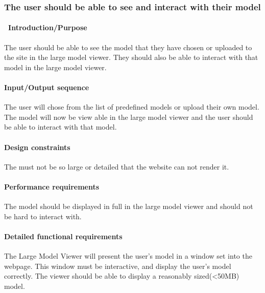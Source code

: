 \documentclass[letterpaper, 10pt, draftclsnofoot, compsoc, onecolumn]{IEEEtran}
\begin{document}
{%

\subsubsection[{Viewable Model}]{\rmfamily\bfseries\color{black}The user should be able to see and interact with their model}
\paragraph[\ Introduction/Purpose of this
feature]{\foreignlanguage{english}{\ }\foreignlanguage{english}{Introduction/Purpose
}}
{\color{black}
The user should be able to see the model that they have chosen or uploaded to the site in the large model viewer. They should also be able to
interact with that model in the large model viewer.  }

\paragraph[Input/Output sequence for this
feature]{\rmfamily\bfseries\color{black}
Input/Output sequence }
{\color{black}
The user will chose from the list of predefined models or upload their own model. The model will now be view able in the large model viewer and
the user should be able to interact with that model. }

\paragraph[Design constraints of this
feature]{\rmfamily\bfseries\color{black} Design
constraints }
{\color{black}
The must not be so large or detailed that the website can not render it. }

\paragraph[Performance requirements of this
feature]{\rmfamily\bfseries\color{black}
Performance requirements }
{\color{black}
The model should be displayed in full in the large model viewer and should not be hard to interact with. }

\paragraph[Detailed functional requirements of this
feature]{\rmfamily\bfseries\color{black}
Detailed functional requirements }
{\color{black}
The Large Model Viewer will present the user's model in a window set into the webpage. This window must be interactive, and display the user's model correctly. The viewer should be able to display a reasonably sized(<50MB) model. }

}
\end{document}
